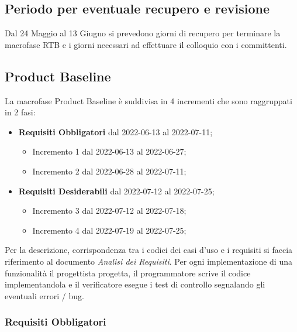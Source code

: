 \subsection*{Periodo per eventuale recupero e revisione}
Dal 24 Maggio al 13 Giugno si prevedono giorni di recupero per terminare la macrofase RTB e i giorni necessari ad effettuare il colloquio con i committenti.

\subsection{Product Baseline}
La macrofase Product Baseline è suddivisa in 4 incrementi che sono raggruppati in 2 fasi:
\begin{itemize}
    \item \textbf{Requisiti Obbligatori} dal 2022-06-13 al 2022-07-11;
            \begin{itemize}
                \item Incremento 1 dal 2022-06-13 al 2022-06-27;
                \item Incremento 2 dal 2022-06-28 al 2022-07-11;
            \end{itemize}
    \item \textbf{Requisiti Desiderabili} dal 2022-07-12 al 2022-07-25;
            \begin{itemize}
                \item Incremento 3 dal 2022-07-12 al 2022-07-18;
                \item Incremento 4 dal 2022-07-19 al 2022-07-25;
            \end{itemize}
\end{itemize}
Per la descrizione, corrispondenza tra i codici dei casi d'uso e i requisiti si faccia riferimento al documento \emph{Analisi dei Requisiti}. \newline
Per ogni implementazione di una funzionalità il progettista progetta, il programmatore scrive il codice implementandola e il verificatore esegue i test di controllo segnalando gli eventuali errori / bug.
\subsubsection{Requisiti Obbligatori}
